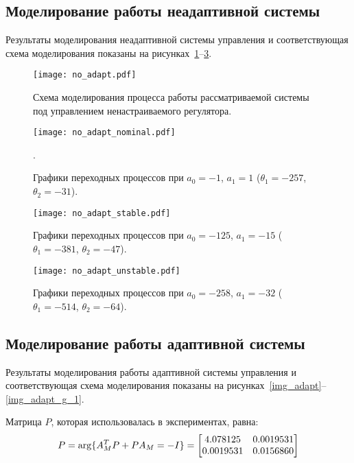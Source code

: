\subsection{Моделирование работы неадаптивной системы}
Результаты моделирования неадаптивной системы управления и соответствующая схема моделирования показаны на рисунках~\ref{img_no_adapt}--\ref{img_no_adapt_unstable}.

\begin{figure}[h!]
    \centering
    \texttt{[image: no\_adapt.pdf]}
    \vspace{0.4cm}
    \caption{Схема моделирования процесса работы рассматриваемой системы под управлением ненастраиваемого регулятора.}
    \label{img_no_adapt}
\end{figure}

\begin{figure}[h!]
    \centering
    \texttt{[image: no\_adapt\_nominal.pdf]}
    \caption{Графики переходных процессов при $a_0=-1$, $a_1 = 1$ ($\theta_1 = -257$, $\theta_2 = -31$).}.
    \label{img_no_adapt_nominal}
\end{figure}

\begin{figure}[h!]
    \centering
    \texttt{[image: no\_adapt\_stable.pdf]}
    \caption{Графики переходных процессов при $a_0=-125$, $a_1 = -15$ ($\theta_1 = -381$, $\theta_2 = -47$).}
\end{figure}

\vspace{1cm}

\begin{figure}[h!]
    \centering
    \texttt{[image: no\_adapt\_unstable.pdf]}
    \caption{Графики переходных процессов при $a_0=-258$, $a_1 = -32$ ($\theta_1 = -514$, $\theta_2 = -64$).}
    \label{img_no_adapt_unstable}
\end{figure}


\subsection{Моделирование работы адаптивной системы}
Результаты моделирования работы адаптивной системы управления и соответствующая схема моделирования показаны на рисунках~\ref{img_adapt}--\ref{img_adapt_g_1}.

Матрица $P$, которая использовалась в экспериментах, равна:
\begin{equation}
    P = \arg \{ A_M^T P + P A_M = -I\} =
    \begin{bmatrix}4.078125&0.0019531\cr 0.0019531&0.0156860\cr \end{bmatrix}
\end{equation}

